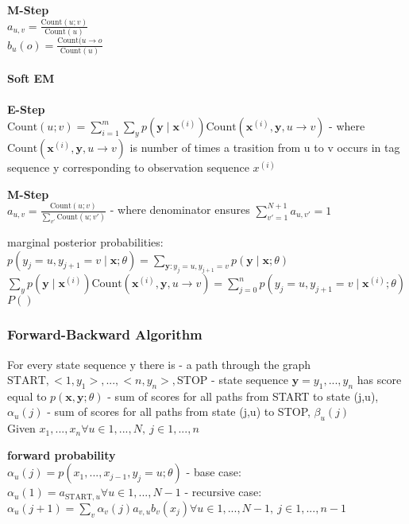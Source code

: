 \documentclass[11pt]{article}
\begin{document}
\textbf{M-Step}\\
\(a_{u,v}=\frac{\text{Count}(u;v)}{\text{Count}(u)}\)\\
\(b_u(o)=\frac{\text{Count}(u\rightarrow o}{\text{Count}(u)}\)

\hypertarget{soft-em}{%
\paragraph{Soft EM}\label{soft-em}}

\textbf{E-Step}\\
\(\text{Count}(u;v)=\sum_{i=1}^m\sum_yp(\boldsymbol y\mid\boldsymbol x^{(i)})\text{Count}(\boldsymbol x^{(i)},\boldsymbol y,u\rightarrow v)\)
- where
\(\text{Count}(\boldsymbol x^{(i)},\boldsymbol y,u\rightarrow v)\) is
number of times a trasition from u to v occurs in tag sequence y
corresponding to observation sequence \(x^{(i)}\)

\textbf{M-Step}\\
\(a_{u,v}=\frac{\text{Count}(u;v)}{\sum_{v'}\text{Count}(u;v')}\) -
where denominator ensures \(\sum_{v'=1}^{N+1}a_{u,v'}=1\)

marginal posterior probabilities:
\(p(y_j=u,y_{j+1}=v\mid\boldsymbol x;\theta)=\sum_{\boldsymbol y:y_j=u,y_{j+1}=v}p(\boldsymbol y\mid\boldsymbol x;\theta)\)\\
\(\sum_yp(\boldsymbol y\mid\boldsymbol x^{(i)})\text{Count}(\boldsymbol x^{(i)},\boldsymbol y,u\rightarrow v)=\sum_{j=0}^np(y_j=u,y_{j+1}=v\mid\boldsymbol x^{(i)};\theta)\)\\
\(P()\)

\hypertarget{forward-backward-algorithm}{%
\subsubsection{Forward-Backward
Algorithm}\label{forward-backward-algorithm}}

For every state sequence y there is - a path through the graph
\(\text{START}, <1,y_1>,...,<n,y_n>,\text{STOP}\) - state sequence
\(\boldsymbol y=y_1,...,y_n\) has score equal to
\(p(\boldsymbol x,\boldsymbol y;\theta)\) - sum of scores for all paths
from START to state (j,u), \(\alpha_u(j)\) - sum of scores for all paths
from state (j,u) to STOP, \(\beta_u(j)\)\\
Given \(x_1,...,x_n\forall u\in 1,...,N,\ j\in1,...,n\)

\textbf{forward probability}\\
\(\alpha_u(j)=p(x_1,...,x_{j-1},y_j=u;\theta)\) - base case:
\(\alpha_u(1)=a_{\text{START},u}\forall u\in1,...,N-1\) - recursive
case:
\(\alpha_u(j+1)=\sum_v\alpha_v(j)a_{v,u}b_v(x_j)\forall u\in1,...,N-1,\ j\in1,...,n-1\)
\end{document}
